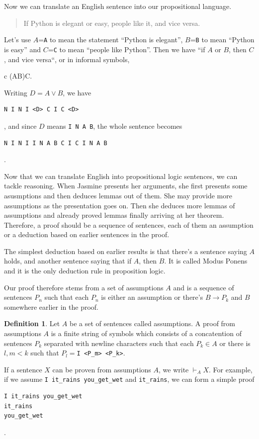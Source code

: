 \documentclass[11pt,oneside,%
]{memoir}
\newenvironment{eqna}{\begin{IEEEeqnarray}{c}}{\end{IEEEeqnarray}\ignorespacesafterend}
\theoremstyle{definition}
\newtheorem{maaritelma}{Definition}
\newcommand{\propositio}{\lstinline[language=propositio]}
\begin{document}
Now we can translate an English sentence into our propositional language.
\begin{quote}
    If Python is elegant or easy, people like it, and vice versa.
\end{quote}
Let's use \(A\)=\lstinline[language=propositio]!A! to mean the statement ``Python is elegant'', \(B\)=\lstinline[language=propositio]!B! to mean ``Python is easy'' and \(C\)=\lstinline[language=propositio]!C! to mean ``people like Python''. Then we have ``if \(A\) or \(B\), then \(C\), and vice versa``, or in informal symbols,
\begin{eqna}
    (A\vee B)\leftrightarrow C.
\end{eqna}
Writing \(D=A\vee B\), we have
\begin{lstlisting}[language=propositio]
N I N I <D> C I C <D>
\end{lstlisting}
, and since \(D\) means \lstinline[language=propositio]!I N A B!, the whole sentence becomes
\begin{lstlisting}[language=propositio]
N I N I I N A B C I C I N A B
\end{lstlisting}
.

Now that we can translate English into propositional logic sentences, we can tackle reasoning. When Jasmine presents her arguments, she first presents some asusmptions and then deduces lemmas out of them. She may provide more assumptions as the presentation goes on. Then she deduces more lemmas of assumptions and already proved lemmas finally arriving at her theorem. Therefore, a proof should be a sequence of sentences, each of them an assumption or a deduction based on earlier sentences in the proof.

The simplest deduction based on earlier results is that there's a sentence saying \(A\) holds, and another sentence saying that if \(A\), then \(B\). It is called Modus Ponens and it is the only deduction rule in proposition logic.

Our proof therefore stems from a set of assumptions \(A\) and is a sequence of sentences \(P_n\) such that each \(P_n\) is either an assumption or there's \(B\rightarrow P_k\) and \(B\) somewhere earlier in the proof.

\begin{maaritelma}
Let \(A\) be a set of sentences called assumptions. A proof from assumptions \(A\) is a finite string of symbols which consists of a concatention of sentences \(P_k\) separated with newline characters such that each \(P_k\in A\) or there is \(l,m<k\) such that \(P_l=\)\lstinline[language=propositio]!I <P_m> <P_k>!.
\end{maaritelma}
If a sentence \(X\) can be proven from assumptions \(A\), we write \(\vdash_AX\). For example, if we assume \propositio!I it_rains you_get_wet! and \propositio!it_rains!, we can form a simple proof
\begin{lstlisting}[language=propositio]
I it_rains you_get_wet
it_rains
you_get_wet
\end{lstlisting}
.
\end{document}
